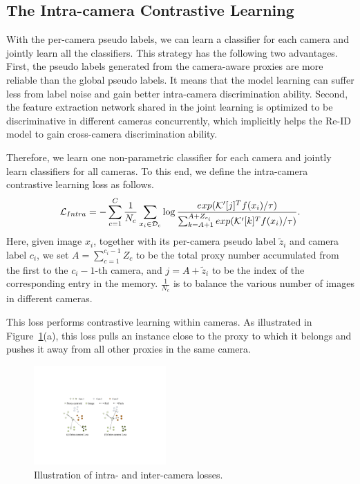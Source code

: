 \documentclass[letterpaper]{article} %
\begin{document}
\subsection{The Intra-camera Contrastive Learning}
With the per-camera pseudo labels, we can learn a classifier for each camera and jointly learn all the classifiers. This strategy has the following two advantages. First, the pseudo labels generated from the camera-aware proxies are more reliable than the global pseudo labels. It means that the model learning can suffer less from label noise and gain better intra-camera discrimination ability. Second, the feature extraction network shared in the joint learning is optimized to be discriminative in different cameras concurrently, which implicitly helps the Re-ID model to gain cross-camera discrimination ability.

Therefore, we learn one non-parametric classifier for each camera and jointly learn classifiers for all cameras. To this end, we define the intra-camera contrastive learning loss as follows.
\begin{equation}
\small
\mathcal{L}_{Intra} = -\sum_{c=1}^{C}\frac{1}{N_c}\sum_{x_i\in \mathcal{D}_c} \log \frac{exp(\mathcal{K}'[j]^T f(x_i)/\tau)}{\sum _{k=A+1}^{A+Z_{c_i}} exp(\mathcal{K}'[k]^T f(x_i)/\tau)}.
\label{eq_intra_loss}
\end{equation}
Here, given image $x_i$, together with its per-camera pseudo label $\tilde{z}_i$ and camera label $c_i$, we set $A = \sum_{c=1}^{c_i-1} Z_c$ to be the total proxy number accumulated from the first to the $c_i-1$-th camera, and $j= A + \tilde{z}_i$ to be the index of the corresponding entry in the memory. $\frac{1}{N_c}$ is to balance the various number of images in different cameras.

This loss performs contrastive learning within cameras. As illustrated in Figure~\ref{fig_loss}(a), this loss pulls an instance close to the proxy to which it belongs and pushes it away from all other proxies in the same camera. %


\begin{figure}[t]
\centering
\includegraphics[width=0.45\textwidth]{./loss_illustration}
\caption{Illustration of intra- and inter-camera losses.}
\label{fig_loss}
\end{figure}
\end{document}
